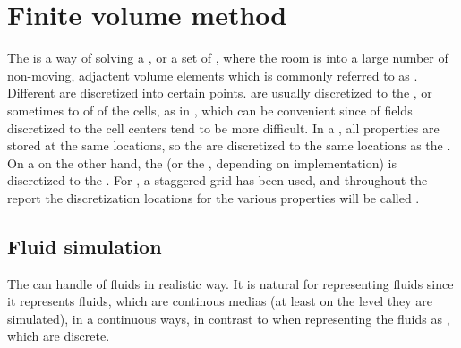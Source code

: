 \chapter{Finite volume method}
\label{chap:ns_equations}



The \FVM is a way of solving a \PDE, or a set of \PDEs, where the room is \discretized into a large number of non-moving, adjactent volume elements which is commonly referred to as \cells. Different \properties are discretized into certain points.  are usually discretized to the , or sometimes to  of  of the cells, as in \citep{Losasso2004}, which can be convenient since \interpolation of fields discretized to the cell centers tend to be more difficult. In a , all properties are stored at the same locations, so the  are discretized to the same locations as the . On a  on the other hand, the \velocity (or the \momentum, depending on implementation) is discretized to the . For \thisprojectwork, a staggered grid has been used, and throughout the report the discretization locations for the various properties will be called .

\section{Fluid simulation}

The \FVM can handle \simulation of fluids in realistic way. It is natural for representing fluids since it represents fluids, which are continous medias (at least on the level they are simulated), in a continuous ways, in contrast to when representing the fluids as , which are discrete.


